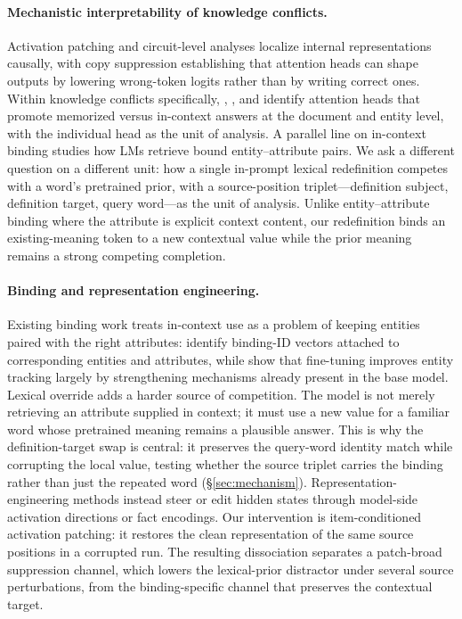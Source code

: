 \documentclass[11pt]{article}
\begin{document}
\paragraph{Mechanistic interpretability of knowledge conflicts.}
Activation patching \citep{vig2020causal, meng2022rome, zhang2024towards} and circuit-level
analyses \citep{wang2023ioi, olsson2022induction, mcdougall2024copy} localize internal
representations causally, with copy suppression \citep{mcdougall2024copy} establishing that
attention heads can shape outputs by lowering wrong-token logits rather than by writing
correct ones. Within knowledge conflicts specifically, \citet{yu2023characterizing},
\citet{ortu2024competition}, and \citet{jin2024cutting} identify attention heads that promote
memorized versus in-context answers at the document and entity level, with the individual
head as the unit of analysis. A parallel line on in-context binding
\citep{feng2024binding, prakash2024finetuning} studies how LMs retrieve bound
entity--attribute pairs. We ask a different question on a different unit: how a single
in-prompt lexical redefinition competes with a word's pretrained prior, with a
source-position triplet---definition subject, definition target, query word---as the unit of
analysis. Unlike entity--attribute binding where the attribute is explicit context content,
our redefinition binds an existing-meaning token to a new contextual value while the prior
meaning remains a strong competing completion.

\paragraph{Binding and representation engineering.}
Existing binding work treats in-context use as a problem of keeping entities paired with the
right attributes: \citet{feng2024binding} identify binding-ID vectors attached to
corresponding entities and attributes, while \citet{prakash2024finetuning} show that
fine-tuning improves entity tracking largely by strengthening mechanisms already present in
the base model. Lexical override adds a harder source of competition. The model is not merely
retrieving an attribute supplied in context; it must use a new value for a familiar word whose
pretrained meaning remains a plausible answer. This is why the definition-target swap is
central: it preserves the query-word identity match while corrupting the local value, testing
whether the source triplet carries the binding rather than just the repeated word
(\S\ref{sec:mechanism}). Representation-engineering methods
\citep{turner2023activation, zou2023representation, hernandez2024inspecting} instead steer
or edit hidden states through model-side activation directions or fact encodings. Our
intervention is item-conditioned activation patching: it restores the clean representation of
the same source positions in a corrupted run. The resulting dissociation separates a
patch-broad suppression channel, which lowers the lexical-prior distractor under several
source perturbations, from the binding-specific channel that preserves the contextual target.
\end{document}
